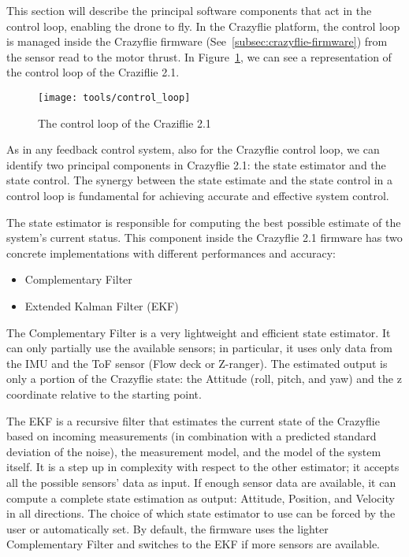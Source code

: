 This section will describe the principal software components that act in the control loop, enabling the drone to fly.
In the Crazyflie platform, the control loop is managed inside the Crazyflie firmware (See~\ref{subsec:crazyflie-firmware}) from the sensor read to the motor thrust.
In Figure~\ref{fig:control_loop}, we can see a representation of the control loop of the Craziflie 2.1. 

\begin{figure}[h]
    \centering
    \texttt{[image: tools/control\_loop]}
    \caption[Craziflie's control loop]{
        The control loop of the Craziflie 2.1~\cite{bitcraze}
    }\label{fig:control_loop}
\end{figure}

As in any feedback control system, also for the Crazyflie control loop, we can identify two principal components in Crazyflie 2.1: the state estimator and the state control. 
The synergy between the state estimate and the state control in a control loop is fundamental for achieving accurate and effective system control. 

The state estimator is responsible for computing the best possible estimate of the system's current status.
This component inside the Crazyflie 2.1 firmware has two concrete implementations with different performances and accuracy:
\begin{itemize}
    \item Complementary Filter
    \item Extended Kalman Filter (EKF)
\end{itemize}

The Complementary Filter is a very lightweight and efficient state estimator. 
It can only partially use the available sensors; in particular, it uses only data from the IMU and the ToF sensor (Flow deck or Z-ranger).
The estimated output is only a portion of the Crazyflie state: the Attitude (roll, pitch, and yaw) and the z coordinate relative to the starting point.

The EKF is a recursive filter that estimates the current state of the Crazyflie based on incoming measurements (in combination with a predicted standard deviation of the noise), the measurement model, and the model of the system itself. 
It is a step up in complexity with respect to the other estimator; it accepts all the possible sensors' data as input. 
If enough sensor data are available, it can compute a complete state estimation as output: Attitude, Position, and Velocity in all directions.
The choice of which state estimator to use can be forced by the user or automatically set. 
By default, the firmware uses the lighter Complementary Filter and switches to the EKF if more sensors are available.

